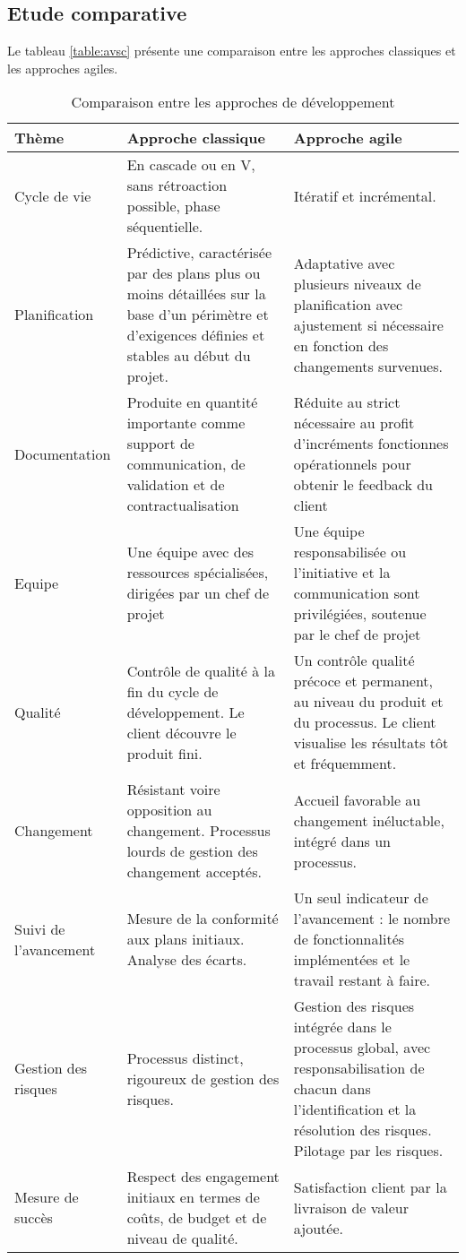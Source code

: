 \subsection{Etude comparative}
Le tableau \ref{table:avsc} \cite{Comparaisonac} présente une comparaison entre les approches classiques et les approches agiles.
    \begin{longtable}{| m{3cm} | m{6cm}| m{6cm} | } 
    \caption{Comparaison entre les approches de développement} 
     \hline
     Thème & Approche classique & Approche agile \\
     \hline
     Cycle de vie & En cascade ou en V, sans rétroaction possible, phase séquentielle. & Itératif et incrémental.\\
     \hline
     Planification &	Prédictive, caractérisée par des plans plus ou moins détaillées sur la base d'un périmètre et d'exigences définies et stables au début du projet. &	Adaptative avec plusieurs niveaux de planification avec ajustement si nécessaire en fonction des changements survenues.\\
     \hline
     Documentation &	Produite en quantité importante comme support de communication, de validation et de contractualisation &	Réduite au strict nécessaire au profit d’incréments fonctionnes opérationnels pour obtenir le feedback du client\\
     \hline
Equipe &	Une équipe avec des ressources spécialisées, dirigées par un chef de projet	& Une équipe responsabilisée ou l’initiative et la communication sont privilégiées, soutenue par le chef de projet \\ 
\hline
Qualité &	Contrôle de qualité à la fin du cycle de développement. Le client découvre le produit fini.	& Un contrôle qualité précoce et permanent, au niveau du produit et du processus. Le client visualise les résultats tôt et fréquemment. \\
\hline
Changement &	Résistant voire opposition au changement.
Processus lourds de gestion des changement acceptés. &	Accueil favorable au changement inéluctable, intégré dans un processus.\\
\hline 
Suivi de l’avancement	& Mesure de la conformité aux plans initiaux.
Analyse des écarts. &	Un seul indicateur de l’avancement : le nombre de fonctionnalités implémentées et le travail restant à faire.\\
\hline
Gestion des risques	& Processus distinct, rigoureux de gestion des risques.	& Gestion des risques intégrée dans le processus global, avec responsabilisation de chacun dans l’identification et la résolution des risques.
Pilotage par les risques.\\
\hline
Mesure de succès &	Respect des engagement initiaux en termes de coûts, de budget et de niveau de qualité. &	Satisfaction client par la livraison de valeur ajoutée.\\
\hline
    \end{longtable}
    
